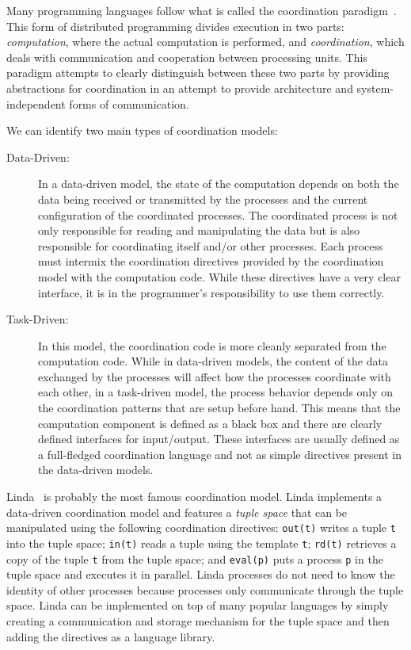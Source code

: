 Many programming languages follow what is called the coordination paradigm~\cite{Papadopoulos98coordinationmodels}. This form of distributed
programming divides execution in two parts: \emph{computation}, where the actual computation is performed, and
\emph{coordination}, which deals with communication and cooperation between processing units. This paradigm attempts to clearly distinguish between
these two parts by providing abstractions for coordination in an attempt to provide architecture and system-independent forms of communication.

We can identify two main types of coordination models:

\begin{description}
   \item[Data-Driven:] In a data-driven model,
the state of the computation depends on both the data being received or transmitted by the processes and the current configuration
of the coordinated processes. The coordinated process is not only responsible for reading and manipulating the data but is also
responsible for coordinating itself and/or other processes. Each process must intermix the coordination directives provided by the coordination
model with the computation code. While these directives have a very clear interface, it is in the programmer's responsibility to use them correctly.

   \item[Task-Driven:] In this model, the coordination code is more cleanly separated from the computation code. While in data-driven models, the content of the data exchanged by the processes will affect how the processes coordinate with each other, in a task-driven model, the process behavior depends only on the coordination patterns that are setup before hand. This means that the computation component is defined as a black box and there are clearly defined interfaces for input/output. These interfaces are usually defined as a full-fledged coordination language and not as
   simple directives present in the data-driven models.
\end{description}

Linda~\cite{linda} is probably the most famous coordination model. Linda implements a data-driven coordination model
and features a \emph{tuple space} that can be manipulated using the following coordination directives: \texttt{out(t)}
writes a tuple \texttt{t} into the tuple space; \texttt{in(t)} reads a tuple using the template \texttt{t}; \texttt{rd(t)} retrieves
a copy of the tuple \texttt{t} from the tuple space; and \texttt{eval(p)} puts a process \texttt{p} in the tuple space and executes it in parallel.
Linda processes do not need to know the identity of other processes because processes only communicate through the tuple space.
Linda can be implemented on top of many popular languages by simply creating a communication and storage mechanism for the tuple space
and then adding the directives as a language library.

